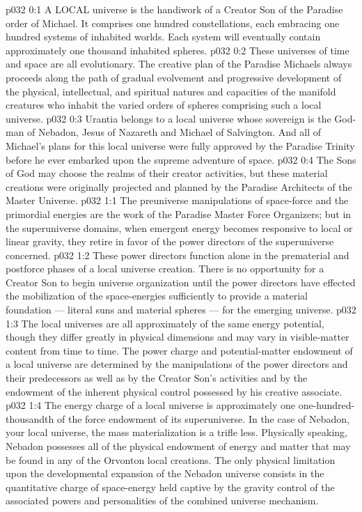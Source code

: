 \vs p032 0:1 A LOCAL universe is the handiwork of a Creator Son of the Paradise order of Michael. It comprises one hundred constellations, each embracing one hundred systems of inhabited worlds. Each system will eventually contain approximately one thousand inhabited spheres.
\vs p032 0:2 These universes of time and space are all evolutionary. The creative plan of the Paradise Michaels always proceeds along the path of gradual evolvement and progressive development of the physical, intellectual, and spiritual natures and capacities of the manifold creatures who inhabit the varied orders of spheres comprising such a local universe.
\vs p032 0:3 Urantia belongs to a local universe whose sovereign is the God\hyp{}man of Nebadon, Jesus of Nazareth and Michael of Salvington. And all of Michael’s plans for this local universe were fully approved by the Paradise Trinity before he ever embarked upon the supreme adventure of space.
\vs p032 0:4 The Sons of God may choose the realms of their creator activities, but these material creations were originally projected and planned by the Paradise Architects of the Master Universe.
\vs p032 1:1 The preuniverse manipulations of space\hyp{}force and the primordial energies are the work of the Paradise Master Force Organizers; but in the superuniverse domains, when emergent energy becomes responsive to local or linear gravity, they retire in favor of the power directors of the superuniverse concerned.
\vs p032 1:2 These power directors function alone in the prematerial and postforce phases of a local universe creation. There is no opportunity for a Creator Son to begin universe organization until the power directors have effected the mobilization of the space\hyp{}energies sufficiently to provide a material foundation --- literal suns and material spheres --- for the emerging universe.
\vs p032 1:3 \pc The local universes are all approximately of the same energy potential, though they differ greatly in physical dimensions and may vary in visible\hyp{}matter content from time to time. The power charge and potential\hyp{}matter endowment of a local universe are determined by the manipulations of the power directors and their predecessors as well as by the Creator Son’s activities and by the endowment of the inherent physical control possessed by his creative associate.
\vs p032 1:4 The energy charge of a local universe is approximately one one\hyp{}hundred\hyp{}thousandth of the force endowment of its superuniverse. In the case of Nebadon, your local universe, the mass materialization is a trifle less. Physically speaking, Nebadon possesses all of the physical endowment of energy and matter that may be found in any of the Orvonton local creations. The only physical limitation upon the developmental expansion of the Nebadon universe consists in the quantitative charge of space\hyp{}energy held captive by the gravity control of the associated powers and personalities of the combined universe mechanism.
